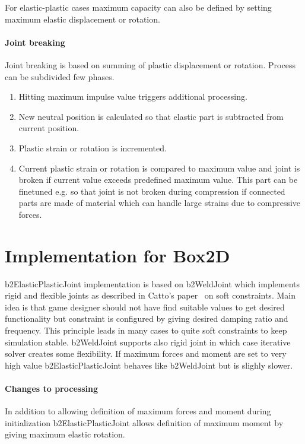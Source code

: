 \documentclass{jcgt}
\begin{document}
For elastic-plastic cases maximum capacity can also be defined by setting maximum elastic 
displacement or rotation.


\paragraph{Joint breaking}
Joint breaking is based on summing of plastic displacement or rotation.
Process can be subdivided few phases.

\begin{enumerate}
\item Hitting maximum impulse value triggers additional processing.
\item New neutral position is calculated so that elastic part is subtracted from current position.
\item Plastic strain or rotation is incremented.
\item Current plastic strain or rotation is compared to maximum value and joint is broken if 
current value exceeds predefined maximum value. This part can be finetuned e.g. so that joint is 
not broken during compression if connected parts are made of material which can handle large
strains due to compressive forces. 
\end{enumerate}


\section{Implementation for Box2D}
b2ElasticPlasticJoint implementation is based on b2WeldJoint which implements rigid and flexible joints as
described in Catto's paper~ on soft constraints. Main idea is that game designer should not have
find suitable values to get desired functionality but constraint is configured by giving desired  damping ratio and frequency.
This principle leads in many cases to quite soft constraints to keep simulation stable. 
b2WeldJoint supports also rigid joint in which case iterative solver creates some flexibility.
If maximum forces and moment are set to very high value b2ElasticPlasticJoint behaves like b2WeldJoint but is slighly slower.

\paragraph{Changes to processing} 
In addition to allowing definition of maximum forces and moment during initialization 
b2ElasticPlasticJoint allows definition of maximum moment by giving maximum elastic rotation.
\end{document}
